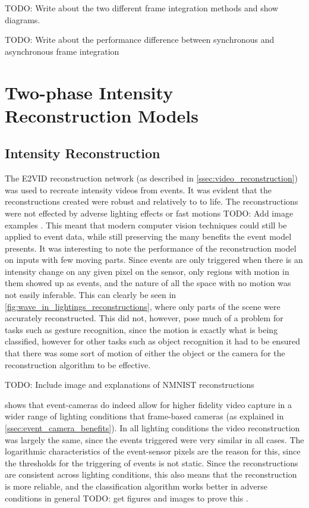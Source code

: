 \color{red} TODO: Write about the two different frame integration methods and show diagrams. \color{black}

\color{red} TODO: Write about the performance difference between synchronous and asynchronous frame integration \color{black}

\section{Two-phase Intensity Reconstruction Models}

\subsection{Intensity Reconstruction}

The E2VID reconstruction network (as described in \cref{ssec:video_reconstruction}) was used to recreate intensity videos from events. It was evident that the reconstructions created were robust and relatively to to life. The reconstructions were not effected by adverse lighting effects or fast motions \color{red} TODO: Add image examples \color{black}. This meant that modern computer vision techniques could still be applied to event data, while still preserving the many benefits the event model presents. It was interesting to note the performance of the reconstruction model on inputs with few moving parts. Since events are only triggered when there is an intensity change on any given pixel on the sensor, only regions with motion in them showed up as events, and the nature of all the space with no motion was not easily inferable. This can clearly be seen in \cref{fig:wave_in_lightings_reconstructions}, where only parts of the scene were accurately reconstructed. This did not, however, pose much of a problem for tasks such as gesture recognition, since the motion is exactly what is being classified, however for other tasks such as object recognition it had to be ensured that there was some sort of motion of either the object or the camera for the reconstruction algorithm to be effective.

\color{red} TODO: Include image and explanations of NMNIST reconstructions \color{black}

 shows that event-cameras do indeed allow for higher fidelity video capture in a wider range of lighting conditions that frame-based cameras (as explained in \cref{ssec:event_camera_benefits}). In all lighting conditions the video reconstruction was largely the same, since the events triggered were very similar in all cases. The logarithmic characteristics of the event-sensor pixels are the reason for this, since the thresholds for the triggering of events is not static. Since the reconstructions are consistent across lighting conditions, this also means that the reconstruction is more reliable, and the classification algorithm works better in adverse conditions in general \color{red} TODO: get figures and images to prove this \color{black}.

